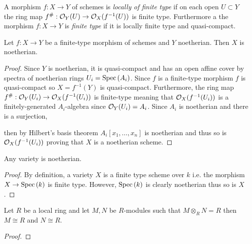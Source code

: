\documentclass[12pt]{article}
\begin{document}
\begin{definition}
A morphism $f : X \to Y$ of schemes is \textit{locally of finite type} if on each open $U \subset Y$ the ring map $f^\# : \mathcal{O}_{Y}(U) \to \mathcal{O}_{X}(f^{-1}(U))$ is finite type. Furthermore a the morphism $f :  X \to Y$ is \textit{finite type} if it is locally finite type and quasi-compact.
\end{definition}

\begin{lemma}
Let $f : X \to Y$ be a finite-type morphism of schemes and $Y$ noetherian. Then $X$ is noetherian.
\end{lemma}

\begin{proof}
Since $Y$ is noetherian, it is quasi-compact and has an open affine cover by spectra of noetherian rings $U_i = \mathrm{Spec}\left( A_i \right)$. Since $f$ is a finite-type morphism $f$ is quasi-compact so $X = f^{-1}(Y)$ is quasi-compact. Furthermore, the ring map $f^\# : \mathcal{O}_{Y}(U_i) \to \mathcal{O}_{X}(f^{-1}(U_i))$ is finite-type meaning that $\mathcal{O}_{X}(f^{-1}(U_i))$ is a finitely-generated $A_i$-algebra since $\mathcal{O}_{Y}(U_i) = A_i$. Since $A_i$ is noetherian and there is a surjection, \begin{center}
\end{center}
then by Hilbert's basis theorem $A_i[x_1, \dots, x_n]$ is noetherian and thus so is $\mathcal{O}_{X}(f^{-1}(U_i))$ proving that $X$ is a noetherian scheme. 
\end{proof}

\begin{corollary}
Any variety is noetherian.
\end{corollary}

\begin{proof}
By definition, a variety $X$ is a finite type scheme over $k$ i.e. the morphism $X \to \mathrm{Spec}\left( k \right)$ is finite type. However, $\mathrm{Spec}\left( k \right)$ is clearly noetherian thus so is $X$.
\end{proof}

\begin{lemma} \label{tensor_inverse}
Let $R$ be a local ring and let $M, N$ be $R$-modules such that $M \otimes_R N = R$ then $M \cong R$ and $N \cong R$.
\end{lemma}

\begin{proof}

\end{proof}
\end{document}
